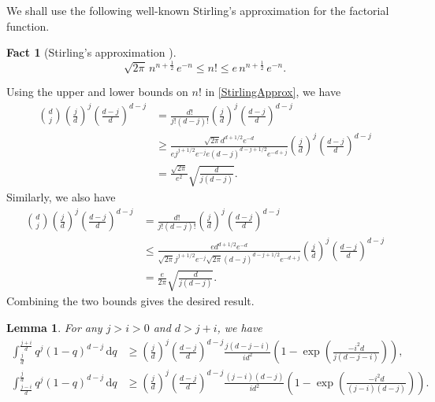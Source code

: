 \documentclass[onecolumn,letterpaper]{IEEEtran}
\newtheorem{lemma}{Lemma}
\newtheorem{fact}{Fact}
\newcommand{\cp}{{q}}
\newcommand*{\dif}{{\,\mathrm{d}}}
\begin{document}
\begin{IEEEproof}
We shall use the following well-known Stirling's approximation \cite{stirling} for the factorial function. 
\begin{fact}[Stirling's approximation \cite{stirling}] 
\begin{equation}
\label{StirlingApprox}
 \sqrt{2\pi} \, n^{n+\frac{1}{2}} \, e^{-n} \le n! \le e \, n^{n+\frac{1}{2}} \, e^{-n}.
\end{equation}
\end{fact}


Using the upper and lower bounds on $n!$ in \eqref{StirlingApprox}, we have
\begin{align*}
\binom{d}{j} \left( \frac{j}{d} \right)^j \left( \frac{d-j}{d} \right)^{d-j} &= \frac{d!}{j!(d-j)!} \left( \frac{j}{d} \right)^j \left( \frac{d-j}{d} \right)^{d-j} \\ 
&\ge \frac{\sqrt{2\pi} d^{d+1/2} e^{-d}}{e j^{j+1/2} e^{-j} e (d-j)^{d-j+1/2} e^{-d+j}} \left( \frac{j}{d} \right)^j \left( \frac{d-j}{d} \right)^{d-j} \\ 
&= \frac{\sqrt{2\pi}}{e^2} \sqrt{\frac{d}{j(d-j)}}.
\end{align*}
Similarly, we also have
\begin{align*}
\binom{d}{j} \left( \frac{j}{d} \right)^j \left( \frac{d-j}{d} \right)^{d-j} &= \frac{d!}{j!(d-j)!} \left( \frac{j}{d} \right)^j \left( \frac{d-j}{d} \right)^{d-j} \\ 
&\le \frac{e d^{d+1/2} e^{-d}}{\sqrt{2\pi} j^{j+1/2} e^{-j} \sqrt{2\pi} (d-j)^{d-j+1/2} e^{-d+j}} \left( \frac{j}{d} \right)^j \left( \frac{d-j}{d} \right)^{d-j} \\ 
&= \frac{e}{2\pi} \sqrt{\frac{d}{j(d-j)}}.
\end{align*}
Combining the two bounds gives the desired result. 
\end{IEEEproof}%
\begin{lemma} \label{lem:int_j_alpha}
For any $j >  i  > 0$ and $d > j +  i  $, we have 
\begin{align} 
\int_{\frac {j}{d}}^{\frac {j+ i }{d}} \cp^j (1-\cp)^{d-j} \dif \cp &\geq \left( \frac{j}{d} \right)^j \left( \frac{d-j}{d} \right)^{d-j} \frac{j(d-j- i )}{ i  d^2} \left( 1 - \exp\left( \frac{-i ^2 d  }{j (d-j- i )} \right) \right), \label{eq:lem3_1} \\ 
\int_{\frac {j- i }{d}}^{\frac {j}{d}} \cp^j (1-\cp)^{d-j} \dif \cp &\geq \left( \frac{j}{d} \right)^j \left( \frac{d-j}{d} \right)^{d-j} \frac{(j- i )(d-j)}{i d^2 } \left( 1 - \exp\left( \frac{- i ^2 d }{(j- i )(d-j)} \right) \right). \label{eq:lem3_2}
\end{align}
\end{lemma}
\end{document}
